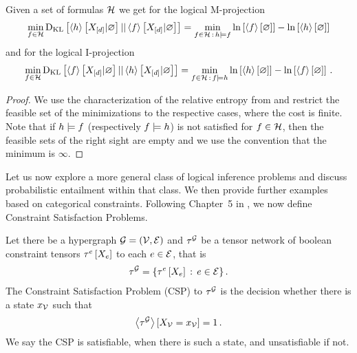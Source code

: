 \begin{theorem}
    Given a set of formulas $\mathcal{H}$ we get for the logical M-projection
    \begin{align*}
        \min_{f\in\mathcal{H}} \mathrm{D}_{\mathrm{KL}}\left[ \left\langle h\right\rangle \left[ X_{[d]} | \varnothing \right] || \left\langle f\right\rangle \left[ X_{[d]} | \varnothing \right] \right]
        = \min_{f\in\mathcal{H}\,:\,h\models f} \ln \left[ \left\langle f\right\rangle \left[ \varnothing \right] \right] - \ln \left[ \left\langle h\right\rangle \left[ \varnothing \right] \right] 
    \end{align*}
    and for the logical I-projection
    \begin{align*}
        \min_{f\in\mathcal{H}} \mathrm{D}_{\mathrm{KL}}\left[ \left\langle f\right\rangle \left[ X_{[d]} | \varnothing \right] || \left\langle h\right\rangle \left[ X_{[d]} | \varnothing \right] \right]
        = \min_{f\in\mathcal{H}\,:\,f\models h} \ln \left[ \left\langle h\right\rangle \left[ \varnothing \right] \right] - \ln \left[ \left\langle f\right\rangle \left[ \varnothing \right] \right] \, .
    \end{align*}
\end{theorem}
\begin{proof}
    We use the characterization of the relative entropy from  and restrict the feasible set of the minimizations to the respective cases, where the cost is finite.
    Note that if $h\models f$ (respectively $f\models h$) is not satisfied for $f\in\mathcal{H}$, then the feasible sets of the right sight are empty and we use the convention that the minimum is $\infty$.
\end{proof}




Let us now explore a more general class of logical inference problems and discuss probabilistic entailment within that class.
We then provide further examples based on categorical constraints.
Following Chapter~5 in \cite{russell_artificial_2021}, we now define Constraint Satisfaction Problems.

\begin{definition}\label{def:csp}
    Let there be a hypergraph $\mathcal{G}=(\mathcal{V},\mathcal{E})$ and $\tau^{\mathcal{G}}$ be a tensor network of boolean constraint tensors $\tau^{e}\left[X_{e}\right]$ to each $e\in\mathcal{E}$, that is
    \begin{align*}
        \tau^{\mathcal{G}} = \{ \tau^{e}\left[X_{e}\right] \, : \, e\in\mathcal{E} \} \, .
    \end{align*}
    The Constraint Satisfaction Problem (CSP) to $\tau^{\mathcal{G}}$ is the decision whether there is a state $x_{\mathcal{V}}$ such that
    \begin{align*}
        \left\langle \tau^{\mathcal{G}}\right\rangle \left[ X_{\mathcal{V}}=x_{\mathcal{V}} \right] = 1 \, .
    \end{align*}
    We say the CSP is satisfiable, when there is such a state, and unsatisfiable if not.
\end{definition}

